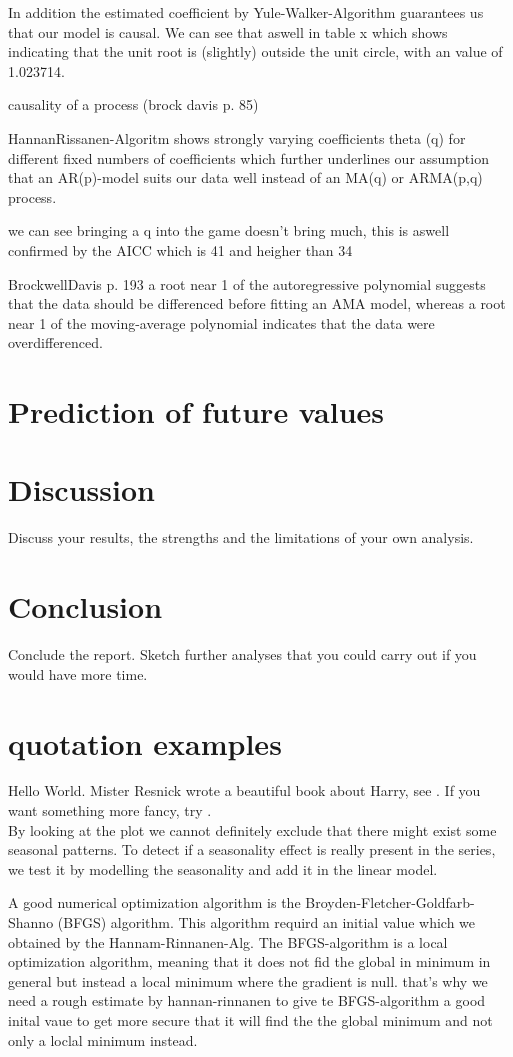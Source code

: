 \documentclass[11pt,a4paper]{article}
\begin{document}
In addition the estimated coefficient by Yule-Walker-Algorithm guarantees us that our model is causal. We can see that aswell in table x which shows indicating that the unit root is (slightly) outside the unit circle, with an value of 1.023714.

causality of a process (brock davis p. 85)

HannanRissanen-Algoritm shows strongly varying coefficients theta (q) for different fixed numbers of coefficients
which further underlines our assumption that an AR(p)-model suits our data well instead of an MA(q) or ARMA(p,q) process.

we can see bringing a q into the game doesn't bring much, this is aswell confirmed by the AICC which is 41 and heigher than 34

BrockwellDavis p. 193 a root near 1 of the autoregressive polynomial suggests that the data should be differenced before fitting an AMA model, whereas a root near 1 of the moving-average polynomial indicates that the data were overdifferenced. 




\section{Prediction of future values}

\section{Discussion}
Discuss your results, the strengths and the limitations of your own analysis. 

\section{Conclusion}
Conclude the report. Sketch further analyses that you could carry out if you would have more time.


\section{quotation examples}
Hello World. Mister Resnick wrote a beautiful book about Harry, see \citep{Resnick92}. If you want something more fancy, try \citet{Baddeley07}.
\\By looking at the plot we cannot definitely exclude that there might exist some seasonal patterns. To detect if a seasonality effect is really present in the series, we test it by modelling the seasonality and add it in the linear model. 

A good numerical optimization algorithm is the Broyden-Fletcher-Goldfarb-Shanno (BFGS) algorithm. This algorithm requird an initial value which we obtained by the Hannam-Rinnanen-Alg. The BFGS-algorithm is a local optimization algorithm, meaning that it does not fid the global in minimum in general but instead a local minimum where the gradient is null. that's why we need a rough estimate by hannan-rinnanen to give te BFGS-algorithm a good inital vaue to get more secure that it will find the the global minimum and not only a loclal minimum instead.



\end{document}
